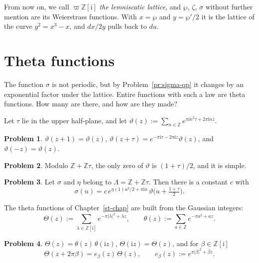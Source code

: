 \documentclass[reqno]{amsart}
\newcounter{chap}
\theoremstyle{definition}
\newtheorem{problem}{Problem}[section]
\theoremstyle{plain}
\newcommand{\Z}{\mathbb{Z}}
\newcommand{\ii}{\mathrm{i}}
\begin{document}
From now on, we call \(\varpi\Z[\ii]\) \emph{the lemniscatic lattice}, and \(\wp\), \(\zeta\), \(\sigma\) without further mention are its Weierstrass functions.  With \(x = \wp\) and \(y = \wp'/2\) it is the lattice of the curve \(y^2 = x^3 - x\), and \(dx/2y\) pulls back to \(d u\).

\section{Theta functions}\label{sec:theta}

The function \(\sigma\) is not periodic, but by Problem~\ref{pr:sigma-qp} it changes by an exponential factor under the lattice.  Entire functions with such a law are theta functions.  How many are there, and how are they made?

Let \(\tau\) lie in the upper half-plane, and let \(\vartheta(z) := \sum_{n \in \Z} e^{\pi\ii n^2\tau + 2\pi\ii n z}\).

\begin{problem}\label{pr:jacobi-qp}
\(\vartheta(z+1) = \vartheta(z)\), \(\vartheta(z + \tau) = e^{-\pi\ii\tau - 2\pi\ii z}\vartheta(z)\), and \(\vartheta(-z) = \vartheta(z)\).
\end{problem}

\begin{problem}\label{pr:jacobi-zero}
Modulo \(\Z+\Z\tau\), the only zero of \(\vartheta\) is \((1+\tau)/2\), and it is simple.
\end{problem}

\begin{problem}\label{pr:sigma-theta}
Let \(\sigma\) and \(\eta\) belong to \(\Lambda = \Z + \Z\tau\).  Then there is a constant \(c\) with
\[
  \sigma(u) = c\, e^{\eta(1) u^2/2 + \pi\ii u}\, \vartheta\bigl(u + \tfrac{1+\tau}{2}\bigr) .
\]
\end{problem}

The theta functions of Chapter~\ref{st-chap} are built from the Gaussian integers:
\[
  \Theta(z) := \sum_{\lambda \in \Z[\ii]} e^{-\pi\lvert\lambda\rvert^2 + \lambda z},
  \qquad
  \theta(z) := \sum_{a \in \Z} e^{-\pi a^2 + a z} .
\]

\begin{problem}\label{pr:Theta-law}
\(\Theta(z) = \theta(z)\,\theta(\ii z)\), \(\Theta(\ii z) = \Theta(z)\), and for \(\beta \in \Z[\ii]\)
\[
  \Theta(z + 2\pi\beta) = e_\beta(z)\, \Theta(z),
  \qquad
  e_\beta(z) := e^{\pi\lvert\beta\rvert^2 + \bar\beta z} .
\]
\end{problem}
\end{document}
